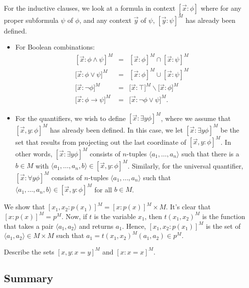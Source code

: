 \noindent For the inductive clauses, we look at a formula in context
$[\vec{x}:\phi ]$ where for any proper subformula $\psi$ of $\phi$,
and any context $\vec{y}$ of $\psi$, $[\vec{y}:\psi ]^M$ has already
been defined.
\begin{itemize}
\item For Boolean combinations:
\[ \begin{array}{lll}
     [\vec{x}:\phi\wedge\psi ]^M &= &[\vec{x}:\phi ]^M\cap [\vec{x}:\psi ]^M \\
     {[}\vec{x}:\phi\vee\psi {]}^M &=& [\vec{x}:\phi ]^M\cup [\vec{x}:\psi ]^M \\
     {[}\vec{x}:\neg \phi {]}^M &=&  {[}\vec{x}:\top {]}^M\backslash
                                    {[}\vec{x}:\phi {]}^M \\
     {[}\vec{x}:\phi\to\psi ]^M &=& {[}\vec{x}:\neg\phi\vee\psi ]^M . \end{array} \]
\item For the quantifiers, we wish to define
  $[\vec{x}:\exists y\phi ]^M$, where we assume that
  $[\vec{x},y:\phi ]^M$ has already been defined.  In this case, we
  let $[\vec{x}:\exists y\phi ]^M$ be the set that results from
  projecting out the last coordinate of $[\vec{x},y:\phi ]^M$.  In
  other words, $[\vec{x}:\exists y\phi ]^M$ consists of $n$-tuples
  $\langle a_1,\dots ,a_n\rangle$ such that there is a $b\in M$ with
  $\langle a_1,\dots ,a_n,b\rangle \in [\vec{x},y:\phi ]^M$.
  Similarly, for the universal quantifier,
  $[\vec{x}:\forall y\phi ]^M$ consists of $n$-tuples
  $\langle a_1,\dots ,a_n\rangle$ such that
  $\langle a_1,\dots ,a_n,b\rangle\in [\vec{x},y:\phi ]^M$ for all
  $b\in M$.
\end{itemize}

\begin{example} We show that $[x_1,x_2:p(x_1)]^M=[x:p(x)]^M\times M$.
  It's clear that $[x:p(x)]^M=p^M$.  Now, if $t$ is the variable
  $x_1$, then $t(x_1,x_2)^M$ is the function that takes a pair
  $\langle a_1,a_2\rangle$ and returns $a_1$.  Hence,
  $[x_1,x_2:p(x_1)]^M$ is the set of
  $\langle a_1,a_2\rangle\in M\times M$ such that
  $a_1=t(x_1,x_2)^M(a_1,a_2)\in p^M$.
\end{example}

\begin{exercise} Describe the sets $[x,y:x=y]^M$ and
  $[x:x=x]^M$. \end{exercise}


\subsection{Summary}

